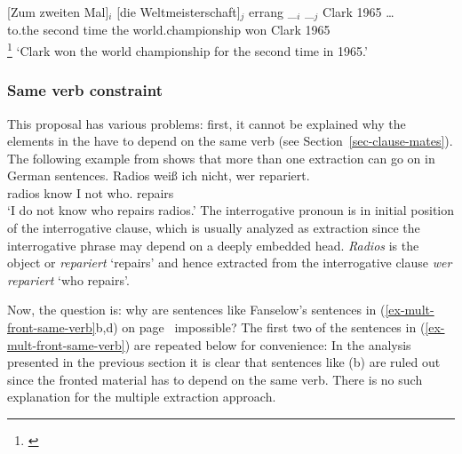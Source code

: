 \ea
\gll {}[Zum zweiten Mal]$_i$ [die Weltmeisterschaft]$_j$ errang \_$_i$ \_$_j$ Clark 1965 \ldots\\
	   \spacebr{}to.the second time \spacebr{}the world.championship won {} {} Clark 1965 {}\\%
\footnote{
        \citep*[]{Benes71}
      }\label{bsp-zum-zweiten-mal-die-Weltmeisterschaft-anal}%
\glt `Clark won the world championship for the second time in 1965.'
\z

\subsubsection{Same verb constraint}

This proposal has various problems: first, it cannot be explained why the elements in the \vf have
to depend on the same verb (see Section~\ref{sec-clause-mates}). The following example from
\citet[]{Fanselow87a} shows that more than one extraction can go on in German sentences.
\ea
\label{ex-radios-weiss-ich-nicht}
\gll Radios weiß ich nicht, wer repariert.\\
     radios know I not who.\nom{} repairs\\
\glt `I do not know who repairs radios.'
\z
The interrogative pronoun is in initial position of the interrogative clause, which is usually
analyzed as extraction since the interrogative phrase may depend on a deeply embedded
head. \emph{Radios} is the object or \emph{repariert} `repairs' and hence extracted from the
interrogative clause \emph{wer repariert} `who repairs'.

Now, the question is: why are sentences like Fanselow's sentences in
(\ref{ex-mult-front-same-verb}b,d) on page~\pageref{ex-mult-front-same-verb} impossible? The first
two of the sentences in (\ref{ex-mult-front-same-verb}) are repeated below for convenience:
\eal
{}
\zl
In the analysis presented in the previous section it is clear that sentences like (b) are
ruled out since the fronted material has to depend on the same verb. There is no such explanation
for the multiple extraction approach.

